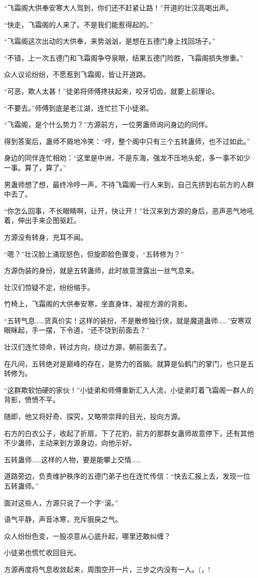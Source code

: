 \begin{this_body}
“飞霜阁大供奉安寒大人驾到，你们还不赶紧让路！”开道的壮汉高喝出声。

“快走，飞霜阁的人来了。不是我们能惹得起的。”

“飞霜阁这次出动的大供奉，来势汹汹，是想在五德门身上找回场子。”

“不错，上一次五德门和飞霜阁争夺泉眼，结果五德门险胜，飞霜阁损失惨重。”

众人议论纷纷，不愿惹到飞霜阁，皆让开道路。

“可恶，欺人太甚！”徒弟将师傅搀扶起来，咬牙切齿，就要上前理论。

“不要去。”师傅到底是老江湖，连忙拦下小徒弟。

“飞霜阁，是个什么势力？”方源前方，一位男蛊师询问身边的同伴。

得到答案后，蛊师不屑地冷笑：“哼，整个阁中只有三个五转蛊师，也不过如此。”

身边的同伴连忙相劝：“这里是中洲，不是东海，强龙不压地头蛇，多一事不如少一事。算了，算了。”

男蛊师想了想，最终冷哼一声，不待飞霜阁一行人来到，自己先挤到右前方的人群中去了。

“你怎么回事，不长眼睛啊，让开，快让开！”壮汉来到方源的身后，恶声恶气地吼着，伸出手来企图驱赶。

方源没有转身，充耳不闻。

“嗯？”壮汉脸上涌现怒色，但旋即脸色骤变，“五转修为？”

方源伪装的身份，就是五转蛊师，此时故意泄露出一丝气息来。

壮汉们惊疑不定，纷纷缩手。

竹椅上，飞霜阁的大供奉安寒，坐直身体，凝视方源的背影。

“五转气息……货真价实！这样的装扮，不是散修独行侠，就是魔道蛊师……”安寒双眼眯起，手一摆，下令道，“还不饶到前面去？”

壮汉们连忙领命，转过方向，绕过方源，朝前面去了。

在凡间，五转绝对是巅峰的存在，是势力的首脑。就算是仙鹤门的掌门，也只是五转修为。

“这群欺软怕硬的家伙！”小徒弟和师傅重新汇入人流，小徒弟盯着飞霜阁一群人的背影，愤愤不平。

随即，他又将好奇、探究，又略带崇拜的目光，投向方源。

右方的白衣公子，收起了折扇，下了花豹，前方的那群女蛊师故意停下，还有其他不少蛊师，主动来到方源身边，向他示好。

五转蛊师……这样的人物，要是能攀上交情……

道路旁边，负责维护秩序的五德门弟子也在连忙传信：“快去汇报上去，发现一位五转蛊师。”

面对这些人，方源只说了一个字“滚。”

语气平静，声音冰寒，充斥狠戾之气。

众人纷纷色变，一股凉意从心底升起，哪里还敢纠缠？

小徒弟也慌忙收回目光。

方源再度将气息收敛起来，周围空开一片，三步之内没有一人。(，!

\end{this_body}

